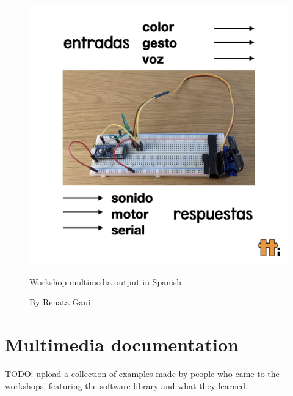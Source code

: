 \begin{figure}[h]
  \centering
  \includegraphics[width=0.75\linewidth,height=0.35\textheight,keepaspectratio]{images/workshop-es-2.jpg}
  \caption{Workshop multimedia output in Spanish}
  \caption*{By Renata Gaui}
  \label{fig:workshop-spanish-flyer-page-2}
\end{figure}

\section{Multimedia documentation}

TODO: upload a collection of examples made by people who came to the workshops, featuring the software library and what they learned.
